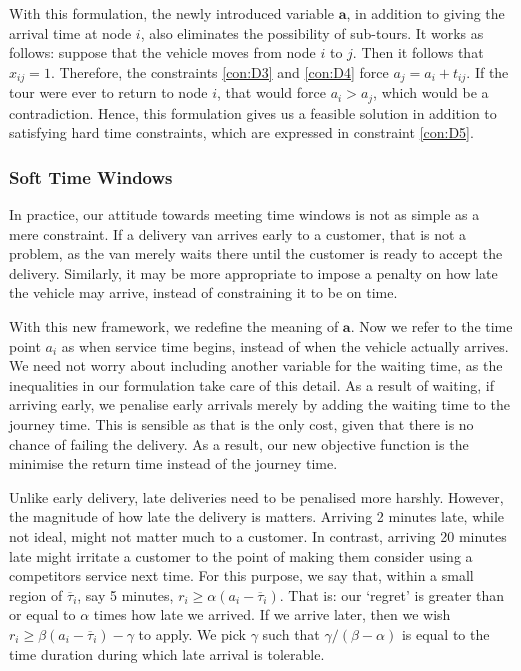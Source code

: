 With this formulation, the newly introduced variable $\mathbf{a}$, in addition to giving the arrival time at node $i$, also eliminates the possibility of sub-tours. It works as follows: suppose that the vehicle moves from node $i$ to $j$. Then it follows that $x_{ij} = 1$. Therefore, the constraints \ref{con:D3} and \ref{con:D4} force $a_j = a_i + t_{ij}$. If the tour were ever to return to node $i$, that would force $a_i>a_j$, which would be a contradiction. Hence, this formulation gives us a feasible solution in addition to satisfying hard time constraints, which are expressed in constraint \ref{con:D5}.

\subsubsection{Soft Time Windows}
In practice, our attitude towards meeting time windows is not as simple as a mere constraint. If a delivery van arrives early to a customer, that is not a problem, as the van merely waits there until the customer is ready to accept the delivery. Similarly, it may be more appropriate to impose a penalty on how late the vehicle may arrive, instead of constraining it to be on time.  

With this new framework, we redefine the meaning of $\mathbf{a}$. Now we refer to the time point $a_i$ as when service time begins, instead of when the vehicle actually arrives. We need not worry about including another variable for the waiting time, as the inequalities in our formulation take care of this detail. As a result of waiting, if arriving early, we penalise early arrivals merely by adding the waiting time to the journey time. This is sensible as that is the only cost, given that there is no chance of failing the delivery. As a result, our new objective function is the minimise the return time instead of the journey time.

Unlike early delivery, late deliveries need to be penalised more harshly. However, the magnitude of how late the delivery is matters. Arriving 2 minutes late, while not ideal, might not matter much to a customer. In contrast, arriving 20 minutes late might irritate a customer to the point of making them consider using a competitors service next time. For this purpose, we say that, within a small region of $\overline{\tau}_i$, say 5 minutes, $r_i \geq \alpha ( a_i - \overline{\tau}_i)$. That is: our `regret' is greater than or equal to $\alpha$ times how late we arrived. If we arrive later, then we wish $r_i \geq \beta (a_i - \overline{\tau}_i) - \gamma$ to apply. We pick $\gamma$ such that $\gamma/(\beta-\alpha)$ is equal to the time duration during which late arrival is tolerable. 

